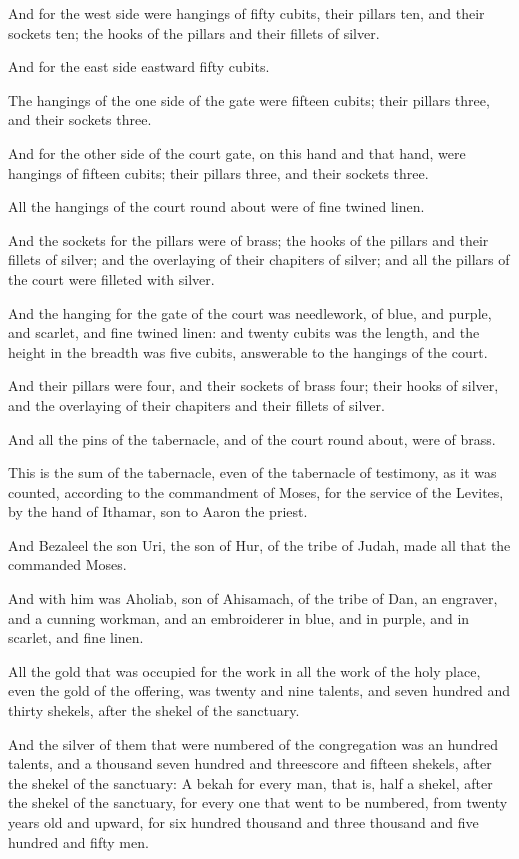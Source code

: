 \Verse And for the west side were hangings of fifty cubits, their pillars ten, and their sockets ten; the hooks of the pillars and their fillets of silver.

\Verse And for the east side eastward fifty cubits.

\Verse The hangings of the one side of the gate were fifteen cubits; their pillars three, and their sockets three.

\Verse And for the other side of the court gate, on this hand and that hand, were hangings of fifteen cubits; their pillars three, and their sockets three.

\Verse All the hangings of the court round about were of fine twined linen.

\Verse And the sockets for the pillars were of brass; the hooks of the pillars and their fillets of silver; and the overlaying of their chapiters of silver; and all the pillars of the court were filleted with silver.

\Verse And the hanging for the gate of the court was needlework, of blue, and purple, and scarlet, and fine twined linen: and twenty cubits was the length, and the height in the breadth was five cubits, answerable to the hangings of the court.

\Verse And their pillars were four, and their sockets of brass four; their hooks of silver, and the overlaying of their chapiters and their fillets of silver.

\Verse And all the pins of the tabernacle, and of the court round about, were of brass.

\Verse This is the sum of the tabernacle, even of the tabernacle of testimony, as it was counted, according to the commandment of Moses, for the service of the Levites, by the hand of Ithamar, son to Aaron the priest.

\Verse And Bezaleel the son Uri, the son of Hur, of the tribe of Judah, made all that the \LORD commanded Moses.

\Verse And with him was Aholiab, son of Ahisamach, of the tribe of Dan, an engraver, and a cunning workman, and an embroiderer in blue, and in purple, and in scarlet, and fine linen.

\Verse All the gold that was occupied for the work in all the work of the holy place, even the gold of the offering, was twenty and nine talents, and seven hundred and thirty shekels, after the shekel of the sanctuary.

\Verse And the silver of them that were numbered of the congregation was an hundred talents, and a thousand seven hundred and threescore and fifteen shekels, after the shekel of the sanctuary: \Verse A bekah for every man, that is, half a shekel, after the shekel of the sanctuary, for every one that went to be numbered, from twenty years old and upward, for six hundred thousand and three thousand and five hundred and fifty men.

